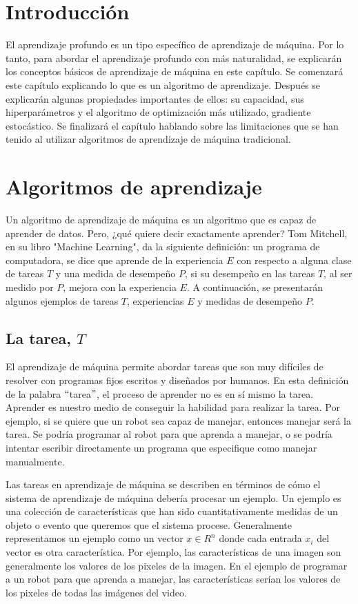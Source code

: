 \section{Introducción}
El aprendizaje profundo es un tipo específico de aprendizaje de máquina. Por lo tanto, para abordar el aprendizaje profundo con más naturalidad, se explicarán los conceptos básicos de aprendizaje de máquina en este capítulo. Se comenzará este capítulo explicando lo que es un algoritmo de aprendizaje. Después se explicarán algunas propiedades importantes de ellos: su capacidad, sus hiperparámetros y el algoritmo de optimización más utilizado, gradiente estocástico. Se finalizará el capítulo hablando sobre las limitaciones que se han tenido al utilizar algoritmos de aprendizaje de máquina tradicional.

\section{Algoritmos de aprendizaje}
Un algoritmo de aprendizaje de máquina es un algoritmo que es capaz de aprender de datos. Pero, ¿qué quiere decir exactamente aprender? Tom Mitchell, en su libro "Machine Learning", da la siguiente definición: un programa de computadora, se dice que aprende de la experiencia $E$ con respecto a alguna clase de tareas $T$ y una medida de desempeño $P$, si su desempeño en las tareas $T$, al ser medido por $P$, mejora con la experiencia $E$. A continuación, se presentarán algunos ejemplos de tareas $T$, experiencias $E$ y medidas de desempeño $P$. \cite{Mitchell:1997:ML:541177}

\subsection{La tarea, $T$}
El aprendizaje de máquina permite abordar tareas que son muy difíciles de resolver con programas fijos escritos y diseñados por humanos.
En esta definición de la palabra $``$tarea$"$, el proceso de aprender no es en sí mismo la tarea. Aprender es nuestro medio de conseguir la habilidad para realizar la tarea. Por ejemplo, si se quiere que un robot sea capaz de manejar, entonces manejar será la tarea. Se podría programar al robot para que aprenda a manejar, o se podría intentar escribir directamente un programa que especifique como manejar manualmente. \cite{goodfellow-et-al-2016} \cite{Mitchell:1997:ML:541177}

\vspace{1em}

Las tareas en aprendizaje de máquina se describen en términos de cómo el sistema de aprendizaje de máquina debería procesar un ejemplo. Un ejemplo es una colección de características que han sido cuantitativamente medidas de un objeto o evento que queremos que el sistema procese. Generalmente representamos un ejemplo como un vector $x \in R^n$ donde cada entrada $x_i$ del vector es otra característica. Por ejemplo, las características de una imagen son generalmente los valores de los pixeles de la imagen. En el ejemplo de programar a un robot para que aprenda a manejar, las características serían los valores de los pixeles de todas las imágenes del video. \cite{goodfellow-et-al-2016}

